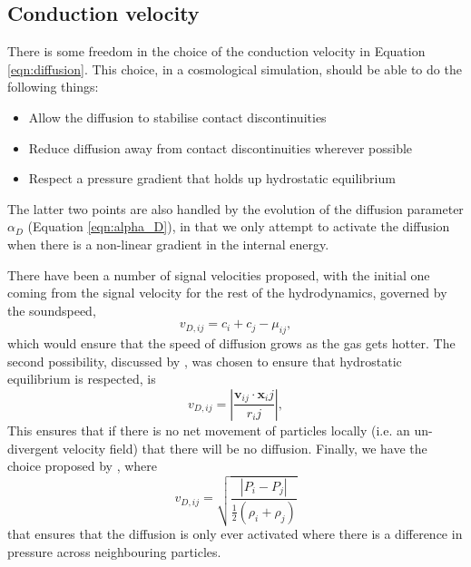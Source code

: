 \subsection{Conduction velocity}

There is some freedom in the choice of the conduction velocity
in Equation \ref{eqn:diffusion}. This choice, in a cosmological simulation,
should be able to do the following things:
\begin{itemize}
    \item Allow the diffusion to stabilise contact discontinuities
    \item Reduce diffusion away from contact discontinuities wherever
          possible
    \item Respect a pressure gradient that holds up hydrostatic equilibrium
\end{itemize}
The latter two points are also handled by the evolution of the diffusion
parameter $\alpha_D$ (Equation \ref{eqn:alpha_D}), in that we only attempt
to activate the diffusion when there is a non-linear gradient in the internal
energy.

There have been a number of signal velocities proposed, with the initial
one coming from the signal velocity for the rest of the hydrodynamics,
governed by the soundspeed,
\begin{equation}
    v_{D, ij} = c_i + c_j - \mu_{ij},
    \label{eqn:vdiffsoundspeed}
\end{equation}
which would ensure that the speed of diffusion grows as the gas gets hotter.
The second possibility, discussed by \citep{Wetzley2007}, was chosen to
ensure that hydrostatic equilibrium is respected, is
\begin{equation}
    v_{D, ij} = \left| \frac{\mathbf{v}_{ij} \cdot \mathbf{x}_ij}{r_ij} \right|,
    \label{eqn:vdiffvij}
\end{equation}
This ensures that if there is no net movement of particles locally (i.e. an un-divergent
velocity field) that there will be no diffusion.
Finally, we have the choice proposed by \citep{Price2008}, where
\begin{equation}
    v_{D, ij} = \sqrt{\frac{|P_i - P_j|}{\frac{1}{2}(\rho_i + \rho_j)}}
    \label{eqn:vdiffP}
\end{equation}
that ensures that the diffusion is only ever activated where there is a difference in
pressure across neighbouring particles.

